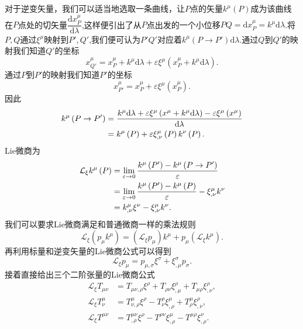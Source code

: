 \documentclass[11pt, a4paper, oneside, onecolumn]{ctexart}
\numberwithin{equation}{subsection}
\begin{document}
对于逆变矢量，我们可以适当地选取一条曲线，让$P$点的矢量$k^{\mu}\left(P\right)$成为该曲线在$P$点处的切矢量$\dfrac{\mathrm{d}x^{\mu}_{P}}{\mathrm{d}\lambda}$,这样便引出了从$P$点出发的一个小位移$PQ=\mathrm{d}x^{\mu}_{P}=k^{\mu}\mathrm{d}\lambda$.将$P,Q$通过$\xi^{\mu}$映射到$P',Q'$,我们便可认为$P'Q'$对应着$k^{\mu}\left(P\to P'\right)\mathrm{d}\lambda$.通过$Q$到$Q'$的映射我们知道$Q'$的坐标
\begin{equation}
x^{\mu}_{Q'}=x^{\mu}_{P}+k^{\mu}\mathrm{d}\lambda+\varepsilon\xi^{\mu}\left(x^{\mu}_{P}+k^{\mu}\mathrm{d}\lambda\right).
\end{equation}
通过$P$到$P'$的映射我们知道$P'$的坐标
\begin{equation}
x^{\mu}_{P'}=x^{\mu}_{P}+\varepsilon\xi^{\mu}\left(x^{\mu}_{P}\right).
\end{equation}
因此
\begin{align}
k^{\mu}\left(P\to P'\right)&=\frac{k^{\mu}\mathrm{d}\lambda+\varepsilon\xi^{\mu}\left(x^{\mu}+k^{\mu}\mathrm{d}\lambda\right)-\varepsilon\xi^{\mu}\left(x^{\mu}\right)}{\mathrm{d}\lambda}\notag\\
&=k^{\mu}\left(P\right)+\varepsilon\xi^{\mu}_{,\nu}\left(P\right)k^{\nu}\left(P\right).\label{1.11.6}
\end{align}
Lie微商为
\begin{align}
\mathcal{L}_{\xi}k^{\mu}\left(P\right)&=\lim_{\varepsilon\to0}\frac{k^{\mu}\left(P'\right)-k^{\mu}\left(P\to P'\right)}{\varepsilon}\notag\\
&=\lim_{\varepsilon\to0}\frac{k^{\mu}\left(P'\right)-k^{\mu}\left(P\right)}{\varepsilon}-\xi^{\mu}_{,\nu}k^{\nu}\notag\\
&=k^{\mu}_{,\nu}\xi^{\nu}-\xi^{\mu}_{,\nu}k^{\nu}.
\end{align}
我们可以要求Lie微商满足和普通微商一样的乘法规则
\begin{equation}
\mathcal{L}_{\xi}\left(p_{\mu}k^{\mu}\right)=\left(\mathcal{L}_{\xi}p_{\mu}\right)k^{\mu}+p_{\mu}\left(\mathcal{L}_{\xi}k^{\mu}\right).
\end{equation}
再利用标量和逆变矢量的Lie微商公式可以得到
\begin{equation}
\mathcal{L}_{\xi}p_{\mu}=p_{\mu,\sigma}\xi^{\sigma}+\xi^{\sigma}_{,\mu}p_{\sigma}.
\end{equation}
接着直接给出三个二阶张量的Lie微商公式
\begin{align}
\mathcal{L}_{\xi}T_{\mu\nu}&=T_{\mu\nu,\rho}\xi^{\rho}+T_{\rho\nu}\xi^{\rho}_{,\mu}+T_{\mu\rho}\xi^{\rho}_{,\nu},\\
\mathcal{L}_{\xi}T^{\mu}_{\nu}&=T^{\mu}_{\nu,\rho}\xi^{\rho}-T^{\rho}_{\nu}\xi^{\mu}_{,\rho}+T^{\mu}_{\rho}\xi^{\rho}_{,\nu},\\
\mathcal{L}_{\xi}T^{\mu\nu}&=T^{\mu\nu}_{,\rho}\xi^{\rho}-T^{\rho\nu}\xi^{\mu}_{,\rho}-T^{\mu\rho}\xi^{\nu}_{,\rho}.
\end{align}
\end{document}
